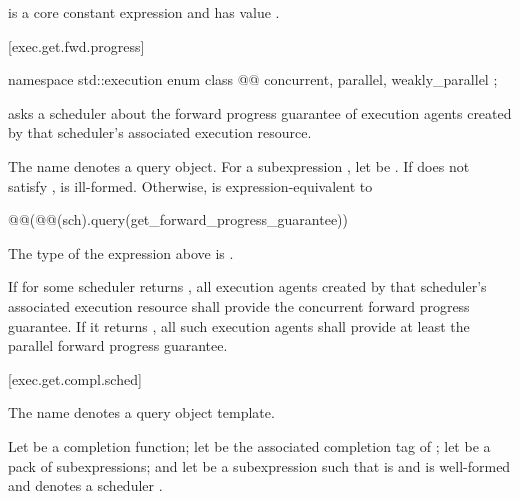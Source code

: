 \pnum
{} is
a core constant expression and has value .

[exec.get.fwd.progress]{}

\begin{codeblock}
namespace std::execution {
  enum class @@ {
    concurrent,
    parallel,
    weakly_parallel
  };
}
\end{codeblock}

\pnum
{} asks a scheduler about
the forward progress guarantee of execution agents
created by that scheduler's associated execution resource.

\pnum
The name  denotes a query object.
For a subexpression , let  be .
If  does not satisfy ,
 is ill-formed.
Otherwise,
 is expression-equivalent to
\begin{codeblock}
@@(@@(sch).query(get_forward_progress_guarantee))
\end{codeblock}

\mandates
The type of the expression above is .

\pnum
If  for some scheduler 
returns ,
all execution agents created by that scheduler's associated execution resource
shall provide the concurrent forward progress guarantee.
If it returns ,
all such execution agents
shall provide at least the parallel forward progress guarantee.

[exec.get.compl.sched]{}

\pnum
The name  denotes a query object template.

\pnum
Let  be a completion function;
let  be
the associated completion tag of ;
let  be a pack of subexpressions; and
let  be a subexpression
such that  is  and
is well-formed and denotes a scheduler .

